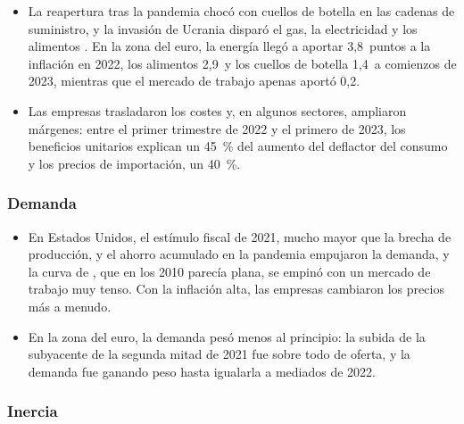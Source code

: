 \documentclass[11pt]{article}
\begin{document}
\begin{itemize}
\item La reapertura tras la pandemia chocó con cuellos de botella en las cadenas de suministro, y la invasión de Ucrania disparó el gas, la electricidad y los alimentos . En la zona del euro, la energía llegó a aportar 3,8~puntos a la inflación en 2022, los alimentos 2,9~y los cuellos de botella 1,4~a comienzos de 2023, mientras que el mercado de trabajo apenas aportó 0,2\nocite{ArceEtAl2024What,ArceEtAl2024SUERF}.
\item Las empresas trasladaron los costes y, en algunos sectores, ampliaron márgenes: entre el primer trimestre de 2022 y el primero de 2023, los beneficios unitarios explican un 45~\% del aumento del deflactor del consumo y los precios de importación, un 40~\%\nocite{HansenToscaniZhou2023}.
\end{itemize}

\subsubsection{Demanda}\label{sec:reciente-demanda}

\begin{itemize}
\item En Estados Unidos, el estímulo fiscal de 2021, mucho mayor que la brecha de producción, y el ahorro acumulado en la pandemia empujaron la demanda\nocite{Summers2021Biden,Blanchard2021Defense}, y la curva de , que en los 2010 parecía plana, se empinó con un mercado de trabajo muy tenso\nocite{Blanchard2016Phillips,BenignoEggertsson2023}. Con la inflación alta, las empresas cambiaron los precios más a menudo\nocite{GautierEtAl2026WP3181}.
\item En la zona del euro, la demanda pesó menos al principio: la subida de la subyacente de la segunda mitad de 2021 fue sobre todo de oferta, y la demanda fue ganando peso hasta igualarla a mediados de 2022\nocite{GoncalvesKoester2022}.
\end{itemize}

\subsubsection{Inercia}\label{sec:reciente-inercia}
\end{document}
